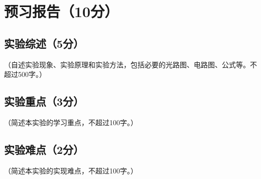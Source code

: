 \documentclass{Preport}
\begin{document}
\setcounter{page}{0}
\makecover

\section{预习报告（10分）}
\subsection{实验综述（5分）}
（自述实验现象、实验原理和实验方法，包括必要的光路图、电路图、公式等。不超过500字。）

\subsection{实验重点（3分）}
（简述本实验的学习重点，不超过100字。）

\subsection{实验难点（2分）}
（简述本实验的实现难点，不超过100字。）




\end{document}
